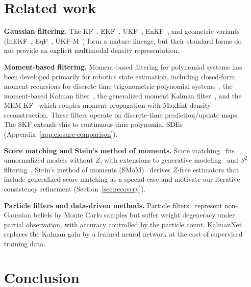 \documentclass{article}
\theoremstyle{definition}
\begin{document}
\section{Related work}

\textbf{Gaussian filtering.}
The KF~\cite{kalman1960}, EKF~\cite{schmidt1966,jazwinski1970},
UKF~\cite{julier1997,wan2000}, EnKF~\cite{evensen1994,burgers1998},
and geometric variants
(InEKF~\cite{barrau2017,hartley2020}, EqF~\cite{vangoor2023},
UKF-M~\cite{brossard2020}) form a mature lineage, but their standard
forms do not provide an explicit multimodal density representation.

\textbf{Moment-based filtering.}
Moment-based filtering for polynomial systems has been developed
primarily for robotics state estimation, including closed-form
moment recursions for discrete-time trigonometric-polynomial
systems~\cite{jasour2021moment}, the moment-based Kalman
filter~\cite{shimizu2023moment}, the generalized moment Kalman
filter~\cite{teng2024gmkf}, and the MEM-KF~\cite{teng2025} which
couples moment propagation with MaxEnt density reconstruction.
These filters operate on discrete-time prediction/update maps. The SKF
extends this to continuous-time polynomial SDEs
(Appendix~\ref{app:closure-comparison}).

\textbf{Score matching and Stein's method of moments.}
Score matching~\cite{hyvarinen2005} fits unnormalized models without
$Z$, with extensions to generative modeling~\cite{song2021scorebased}
and $S^2$ filtering~\cite{bukal2017}. Stein's method of moments
(SMoM)~\cite{ebner2025,kume2026,nagai2026} derives $Z$-free
estimators that include generalized score matching as a special case
and motivate our iterative consistency refinement
(Section~\ref{sec:recovery}).

\textbf{Particle filters and data-driven methods.}
Particle filters~\cite{zanetti2024} represent non-Gaussian beliefs by
Monte Carlo samples but suffer weight degeneracy under partial
observation, with accuracy controlled by the particle count.
KalmanNet~\cite{revach2022} replaces the Kalman gain by a learned
neural network at the cost of supervised training data.

\section{Conclusion}
\end{document}
